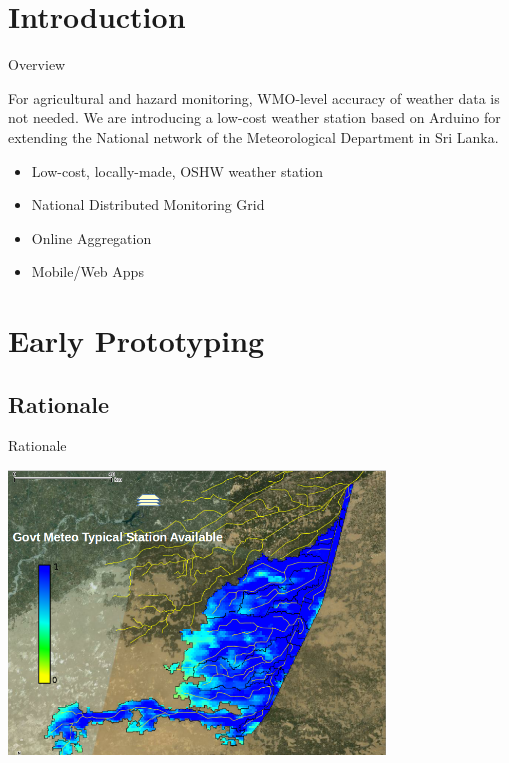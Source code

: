\documentclass[xcolor=dvipsnames,beamer]{beamer} %
\begin{document}
\section{Introduction}
\begin{frame}[fragile]{Overview}

For agricultural and hazard monitoring, WMO-level accuracy of weather data is not needed. We are introducing a low-cost weather station based on Arduino for extending the National network of the Meteorological Department in Sri Lanka.
\newline\linebreak

\begin{itemize}
 \item Low-cost, locally-made, OSHW weather station
 \item National Distributed Monitoring Grid
 \item Online Aggregation
 \item Mobile/Web Apps
\end{itemize}
\end{frame}

\section{Early Prototyping}
\subsection{Rationale}
\begin{frame}[fragile]{Rationale}

\begin{center}
  \includegraphics[width=10cm]{MWS_v1_deltaT_rationale_0}
\end{center}

\end{frame}
\end{document}
